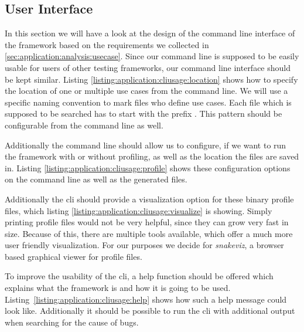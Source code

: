 \subsection{User Interface}

In this section we will have a look at the design of the command line interface
of the framework based on the requirements we collected in
\ref{sec:application:analysis:usecase}. Since our command line is supposed to be
easily usable for users of other testing frameworks, our command line interface
should be kept similar. Listing \ref{listing:application:cliusage:location}
shows how to specify the location of one or multiple use cases from the command
line. We will use a specific naming convention to mark files who define use
cases. Each file which is supposed to be searched has to start with the prefix
. This pattern should be configurable from the command
line as well.



Additionally the command line should allow us to configure, if we want to run
the framework with or without profiling, as well as the location the files are
saved in. Listing \ref{listing:application:cliusage:profile} shows these
configuration options on the command line as well as the generated files.



Additionally the \gls{cli} should provide a visualization option for these binary
profile files, which listing \ref{listing:application:cliusage:visualize} is
showing. Simply printing profile files would not be very helpful, since they can
grow very fast in size. Because of this, there are multiple tools available,
which offer a much more user friendly visualization. For our purposes we decide
for \emph{snakeviz}, a browser based graphical viewer for profile files.
\cite{Snakeviz}

To improve the usability of the \gls{cli}, a help function should be offered which
explains what the framework is and how it is going to be used.
Listing \ref{listing:application:cliusage:help} shows how such a help message
could look like. Additionally it should be possible to run the \gls{cli} with
additional output when searching for the cause of bugs. 

